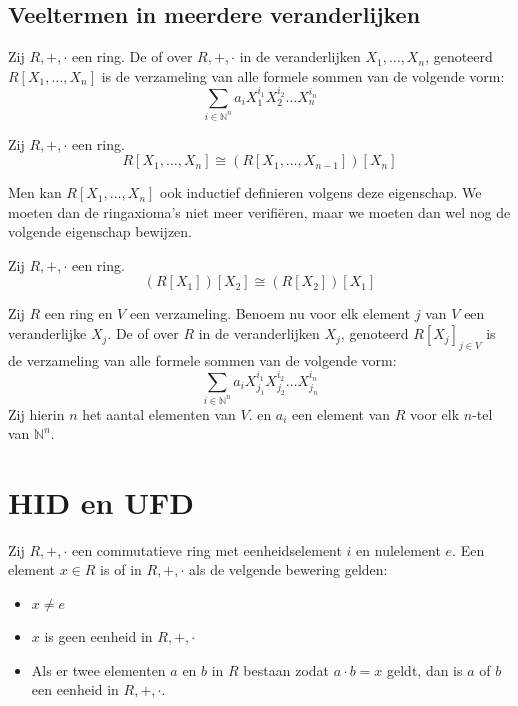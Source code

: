 \documentclass[main.tex]{subfiles}
\begin{document}
\subsection{Veeltermen in meerdere veranderlijken}
\label{sec:veelt-meerd-verand}

\begin{de}
  Zij $R,+,\cdot$ een ring.
  De  of  over $R,+,\cdot$ in de veranderlijken $X_{1},\dotsc,X_{n}$, genoteerd $R[X_{1},\dotsc,X_{n}]$ is de verzameling van alle formele sommen van de volgende vorm:
  \[ \sum_{i\in \mathbb{N}^{n}}a_{i}X_{1}^{i_{1}}X_{2}^{i_{2}}\dotsc X_{n}^{i_{n}}\]
\end{de}

\begin{ei}
  Zij $R,+,\cdot$ een ring.
  \[ R[X_{1},\dotsc,X_{n}] \cong (R[X_{1},\dotsc,X_{n-1}])[X_{n}] \]
\end{ei}

\begin{opm}
  Men kan $R[X_{1},\dotsc,X_{n}]$ ook inductief definieren volgens deze eigenschap.
  We moeten dan de ringaxioma's niet meer verifi\"eren, maar we moeten dan wel nog de volgende eigenschap bewijzen.
\end{opm}

\begin{ei}
  Zij $R,+,\cdot$ een ring.
  \[ (R[X_{1}])[X_{2}] \cong (R[X_{2}])[X_{1}] \]
\end{ei}

\begin{de}
  Zij $R$ een ring en $V$ een verzameling.
  Benoem nu voor elk element $j$ van $V$ een veranderlijke $X_{j}$.
  De  of  over $R$ in de veranderlijken $X_{j}$, genoteerd $R[X_{j}]_{j\in V}$ is de verzameling van alle formele sommen van de volgende vorm:
  \[ \sum_{i\in \mathbb{N}^{n}}a_{i}X_{j_{1}}^{i_{1}}X_{j_{2}}^{i_{2}}\dotsc X_{j_{n}}^{i_{n}}\]
  Zij hierin $n$ het aantal elementen van $V$. en $a_{i}$ een element van $R$ voor elk $n$-tel van $\mathbb{N}^{n}$. 
\end{de}

\section{HID en UFD}
\label{sec:hid-en-ufd}

\begin{de}
  Zij $R,+,\cdot$ een commutatieve ring met eenheidselement $i$ en nulelement $e$.
  Een element $x\in R$ is  of  in $R,+,\cdot$ als de velgende bewering gelden:
  \begin{itemize}
  \item $x \neq e$
  \item $x$ is geen eenheid in $R,+,\cdot$
  \item Als er twee elementen $a$ en $b$ in $R$ bestaan zodat $a\cdot b = x$ geldt, dan is $a$ of $b$ een eenheid in $R,+,\cdot$.
  \end{itemize}
\end{de}
\end{document}
